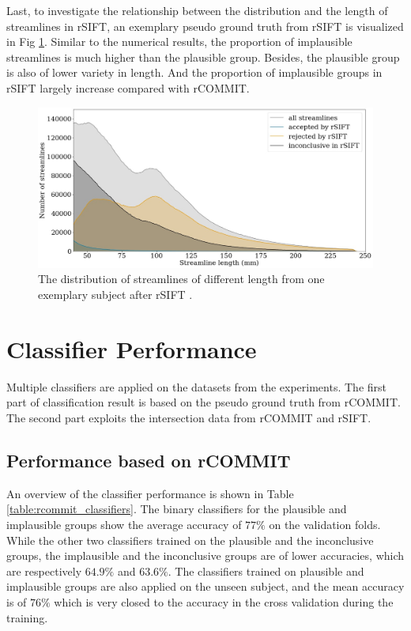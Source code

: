 Last, to investigate the relationship between the distribution and the length of streamlines in rSIFT, an exemplary 
pseudo ground truth from rSIFT is visualized in Fig \ref*{fig:threegroup_sift}. Similar to the numerical results,
the proportion of implausible streamlines is much higher than the plausible group. Besides, the plausible group is also of lower variety in length.
And the proportion of implausible groups in rSIFT largely increase compared with rCOMMIT.

\begin{figure}[ht]
    \centering
    \includegraphics[width= 12cm]{figures/distribution_sift.png}
    \caption{The distribution of streamlines of different length from one exemplary subject after rSIFT \cite{hainAssessingStreamlinePlausibility2022}. }
\label{fig:threegroup_sift}
\end{figure}


\section{Classifier Performance}
Multiple classifiers are applied on the datasets from the experiments. The first part of classification result
is based on the pseudo ground truth from rCOMMIT. The second part exploits the intersection data from rCOMMIT and rSIFT.
\subsection{Performance based on rCOMMIT}

An overview of the classifier performance is shown in Table \ref{table:rcommit_classifiers}.
The binary classifiers for the plausible and implausible groups show the average accuracy
of $77\%$ on the validation folds. While the other two classifiers trained on the 
plausible and the inconclusive groups, the implausible and the inconclusive groups are 
of lower accuracies, which are respectively $64.9\%$ and $63.6\%$. 
The classifiers trained on plausible and implausible groups are also applied on the unseen subject, 
and the mean accuracy is of $76\%$ which is very closed to the accuracy in the cross validation during the training.


